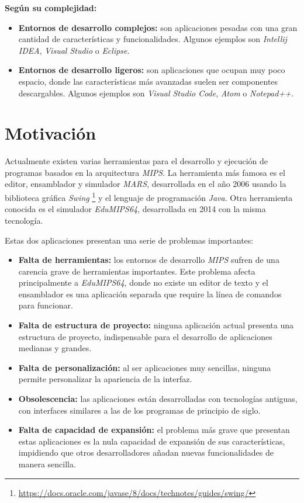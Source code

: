 \noindent \textbf{Según su complejidad:}
\begin{itemize}
    \item \textbf{Entornos de desarrollo complejos:} son aplicaciones pesadas con una gran cantidad de
    características y funcionalidades.
    Algunos ejemplos son \textit{Intellij IDEA},
    \textit{Visual Studio} o \textit{Eclipse}.
    \item \textbf{Entornos de desarrollo ligeros:} son aplicaciones que ocupan muy poco espacio, donde
    las características más avanzadas suelen ser componentes descargables.
    Algunos ejemplos son \textit{Visual Studio Code}, \textit{Atom} o \textit{Notepad++}.
\end{itemize}


\section{Motivación}\label{sec:motivacion}

Actualmente existen varias herramientas para el desarrollo y ejecución de programas basados en
la arquitectura \textit{MIPS}.
La herramienta más famosa es el editor, ensamblador y simulador \textit{MARS}\cite{MARS}, desarrollada en
el año 2006 usando la biblioteca gráfica \textit{Swing}
\footnote{\url{https://docs.oracle.com/javase/8/docs/technotes/guides/swing/}}
y el lenguaje de programación \textit{Java}.
Otra herramienta conocida es el simulador \textit{EduMIPS64}\cite{EDUMIPS64}, desarrollada en 2014 con
la misma tecnología.

\noindent Estas dos aplicaciones presentan una serie de problemas importantes:
\begin{itemize}
    \item \textbf{Falta de herramientas:} los entornos de desarrollo \textit{MIPS} sufren de una
    carencia grave de herramientas importantes.
    Este problema afecta principalmente a \textit{EduMIPS64}, donde no existe un editor de texto y
    el ensamblador es una aplicación separada que require la línea de comandos para funcionar.
    \item \textbf{Falta de estructura de proyecto:} ninguna aplicación actual presenta una estructura
    de proyecto, indispensable para el desarrollo de aplicaciones medianas y grandes.
    \item \textbf{Falta de personalización:} al ser aplicaciones muy sencillas, ninguna permite
    personalizar la apariencia de la interfaz.
    \item \textbf{Obsolescencia:} las aplicaciones están desarrolladas con tecnologías antiguas,
    con interfaces similares a las de los programas de principio de siglo.
    \item \textbf{Falta de capacidad de expansión:} el problema más grave que presentan estas aplicaciones
    es la nula capacidad de expansión de sus características, impidiendo que otros desarrolladores
    añadan nuevas funcionalidades de manera sencilla.
\end{itemize}


